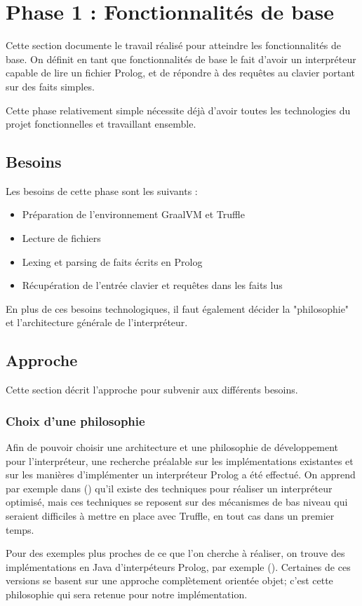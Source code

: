 \documentclass[../report.tex]{subfiles}
\begin{document}
\section{Phase 1 : Fonctionnalités de base}
Cette section documente le travail réalisé pour atteindre les fonctionnalités de base. On définit en tant que fonctionnalités de base le fait d'avoir un interpréteur capable de lire un fichier Prolog, et de répondre à des requêtes au clavier portant sur des faits simples.

Cette phase relativement simple nécessite déjà d'avoir toutes les technologies du projet fonctionnelles et travaillant ensemble.
\subsection{Besoins}
Les besoins de cette phase sont les suivants :
\begin{itemize}
    \item Préparation de l'environnement GraalVM et Truffle
    \item Lecture de fichiers
    \item Lexing et parsing de faits écrits en Prolog
    \item Récupération de l'entrée clavier et requêtes dans les faits lus
\end{itemize}
En plus de ces besoins technologiques, il faut également décider la "philosophie" et l'architecture générale de l'interpréteur.
\subsection{Approche}
Cette section décrit l'approche pour subvenir aux différents besoins.
\subsubsection{Choix d'une philosophie}
Afin de pouvoir choisir une architecture et une philosophie de développement pour l'interpréteur, une recherche préalable sur les implémentations existantes et sur les manières d'implémenter un interpréteur Prolog a été effectué. On apprend par exemple dans \cite{WarrenAM}() qu'il existe des techniques pour réaliser un interpréteur optimisé, mais ces techniques se reposent sur des mécanismes de bas niveau qui seraient difficiles à mettre en place avec Truffle, en tout cas dans un premier temps. 

Pour des exemples plus proches de ce que l'on cherche à réaliser, on trouve des implémentations en Java d'interpéteurs Prolog, par exemple \cite{JIProlog}(). Certaines de ces versions se basent sur une approche complètement orientée objet; c'est cette philosophie qui sera retenue pour notre implémentation.
\end{document}
